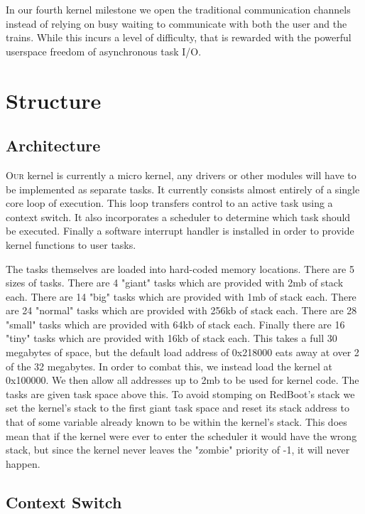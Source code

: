 \documentclass{article}
\begin{document}
In our fourth kernel milestone we open the traditional communication channels
instead of relying on busy waiting to communicate with both the user and the
trains. While this incurs a level of difficulty, that is rewarded with the
powerful userspace freedom of asynchronous task I/O.
\section*{Structure}

\subsection*{Architecture}

\textsc{Our} kernel is currently a micro kernel, any drivers or other modules will have
to be implemented as separate tasks. It currently consists almost entirely of a
single core loop of execution. This loop transfers control to an active task
using a context switch. It also incorporates a scheduler to determine which task
should be executed. Finally a software interrupt handler is installed in order
to provide kernel functions to user tasks.

The tasks themselves are loaded into hard-coded memory locations. There are 5
sizes of tasks. There are 4 "giant" tasks which are provided with 2mb of stack
each.  There are 14 "big" tasks which are provided with 1mb of stack each. There
are 24 "normal" tasks which are provided with 256kb of stack each. There are 28
"small" tasks which are provided with 64kb of stack each. Finally there are 16
"tiny" tasks which are provided with 16kb of stack each. This takes a full 30
megabytes of space, but the default load address of 0x218000 eats away at over 2
of the 32 megabytes. In order to combat this, we instead load the kernel at
0x100000. We then allow all addresses up to 2mb to be used for kernel code. The
tasks are given task space above this. To avoid stomping on RedBoot's stack we
set the kernel's stack to the first giant task space and reset its stack address
to that of some variable already known to be within the kernel's stack. This
does mean that if the kernel were ever to enter the scheduler it would have the
wrong stack, but since the kernel never leaves the "zombie" priority of -1, it
will never happen.

\subsection*{Context Switch}
\end{document}
